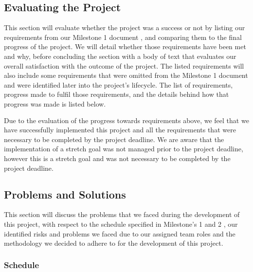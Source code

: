        \subsection{Evaluating the Project}
        \label{subsec:evaluation}

            This section will evaluate whether the project was a success or not by listing our requirements from our Milestone 1 document \cite{coaker}, and comparing them to the final progress of the project. We will detail whether those requirements have been met and why, before concluding the section with a body of text that evaluates our overall satisfaction with the outcome of the project. The listed requirements will also include some requirements that were omitted from the Milestone 1 document \cite{coaker} and were identified later into the project's lifecycle. The list of requirements, progress made to fulfil those requirements, and the details behind how that progress was made is listed below.

            
            \vspace{2em}

            Due to the evaluation of the progress towards requirements above, we feel that we have successfully implemented this project and all the requirements that were necessary to be completed by the project deadline. We are aware that the implementation of a stretch goal was not managed prior to the project deadline, however this is a stretch goal and was not necessary to be completed by the project deadline.

        \subsection{Problems and Solutions}
        \label{subsec:probs_solutions}

            This section will discuss the problems that we faced during the development of this project, with respect to the schedule specified in Milestone's 1 and 2 \cite{coaker, mile2}, our identified risks and problems we faced due to our assigned team roles and the methodology we decided to adhere to for the development of this project. 

            \subsubsection{Schedule}
            \label{subsec:schedule}

